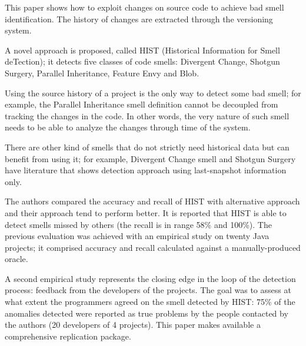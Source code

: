 This paper shows how to exploit changes on source code to achieve bad smell identification. The history of changes are extracted through the versioning system. 

A novel approach is proposed, called HIST (Historical Information for Smell deTection); it detects five classes of code smells: Divergent Change, Shotgun Surgery, Parallel Inheritance, Feature Envy and Blob.


Using the source history of a project is the only way to detect some bad smell; for example, the Parallel Inheritance smell definition cannot be decoupled from tracking the changes in the code. In other words, the very nature of such smell needs to be able to analyze the changes through time of the system.

There are other kind of smells that do not strictly need historical data but can benefit from using it; for example, Divergent Change smell and Shotgun Surgery have literature that shows detection approach using last-snapshot information only.

The authors compared the accuracy and recall of HIST with alternative approach and their approach tend to perform better. It is reported that HIST is able to detect smells missed by others (the recall is in range 58\% and 100\%). The previous evaluation was achieved with an empirical study on twenty Java projects; it comprised accuracy and recall calculated against a manually-produced oracle.

A second empirical study represents the closing edge in the loop of the detection process: feedback from the developers of the projects. The goal was to assess at what extent the programmers agreed on the smell detected by HIST: 75\% of the anomalies detected were reported as true problems by the people contacted by the authors (20 developers of 4 projects).
This paper makes available a comprehensive replication package.
